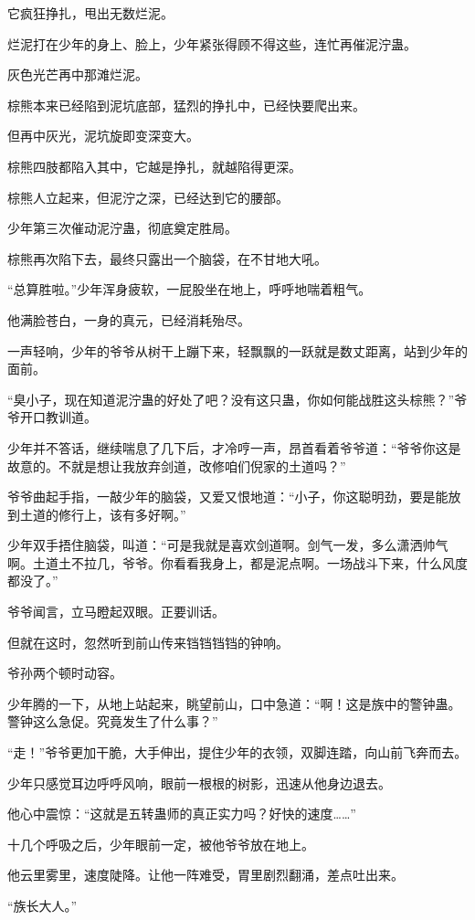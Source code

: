 \begin{this_body}
它疯狂挣扎，甩出无数烂泥。

烂泥打在少年的身上、脸上，少年紧张得顾不得这些，连忙再催泥泞蛊。

灰色光芒再中那滩烂泥。

棕熊本来已经陷到泥坑底部，猛烈的挣扎中，已经快要爬出来。

但再中灰光，泥坑旋即变深变大。

棕熊四肢都陷入其中，它越是挣扎，就越陷得更深。

棕熊人立起来，但泥泞之深，已经达到它的腰部。

少年第三次催动泥泞蛊，彻底奠定胜局。

棕熊再次陷下去，最终只露出一个脑袋，在不甘地大吼。

“总算胜啦。”少年浑身疲软，一屁股坐在地上，呼呼地喘着粗气。

他满脸苍白，一身的真元，已经消耗殆尽。

一声轻响，少年的爷爷从树干上蹦下来，轻飘飘的一跃就是数丈距离，站到少年的面前。

“臭小子，现在知道泥泞蛊的好处了吧？没有这只蛊，你如何能战胜这头棕熊？”爷爷开口教训道。

少年并不答话，继续喘息了几下后，才冷哼一声，昂首看着爷爷道：“爷爷你这是故意的。不就是想让我放弃剑道，改修咱们倪家的土道吗？”

爷爷曲起手指，一敲少年的脑袋，又爱又恨地道：“小子，你这聪明劲，要是能放到土道的修行上，该有多好啊。”

少年双手捂住脑袋，叫道：“可是我就是喜欢剑道啊。剑气一发，多么潇洒帅气啊。土道土不拉几，爷爷。你看看我身上，都是泥点啊。一场战斗下来，什么风度都没了。”

爷爷闻言，立马瞪起双眼。正要训话。

但就在这时，忽然听到前山传来铛铛铛铛的钟响。

爷孙两个顿时动容。

少年腾的一下，从地上站起来，眺望前山，口中急道：“啊！这是族中的警钟蛊。警钟这么急促。究竟发生了什么事？”

“走！”爷爷更加干脆，大手伸出，提住少年的衣领，双脚连踏，向山前飞奔而去。

少年只感觉耳边呼呼风响，眼前一根根的树影，迅速从他身边退去。

他心中震惊：“这就是五转蛊师的真正实力吗？好快的速度……”

十几个呼吸之后，少年眼前一定，被他爷爷放在地上。

他云里雾里，速度陡降。让他一阵难受，胃里剧烈翻涌，差点吐出来。

“族长大人。”


\end{this_body}
